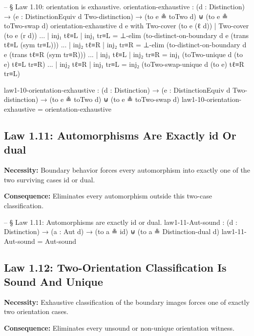 \documentclass[11pt,a4paper]{book}
\def\texttt#1{#1}%
\begin{document}
\begin{code}
-- § Law 1.10: orientation is exhaustive.
orientation-exhaustive :
  (d : Distinction) →
  (e : DistinctionEquiv d Two-distinction) →
  (to e ≗ toTwo d) ⊎ (to e ≗ toTwo-swap d)
orientation-exhaustive d e with Two-cover (to e (ℓ d)) | Two-cover (to e (r d))
... | inj₁ tℓ≡L | inj₁ tr≡L = ⊥-elim (to-distinct-on-boundary d e (trans tℓ≡L (sym tr≡L)))
... | inj₂ tℓ≡R | inj₂ tr≡R = ⊥-elim (to-distinct-on-boundary d e (trans tℓ≡R (sym tr≡R)))
... | inj₁ tℓ≡L | inj₂ tr≡R = inj₁ (toTwo-unique d (to e) tℓ≡L tr≡R)
... | inj₂ tℓ≡R | inj₁ tr≡L = inj₂ (toTwo-swap-unique d (to e) tℓ≡R tr≡L)

law1-10-orientation-exhaustive :
  (d : Distinction) →
  (e : DistinctionEquiv d Two-distinction) →
  (to e ≗ toTwo d) ⊎ (to e ≗ toTwo-swap d)
law1-10-orientation-exhaustive = orientation-exhaustive
\end{code}

\subsection{Law 1.11: Automorphisms Are Exactly id Or dual}

\textbf{Necessity:} Boundary behavior forces every automorphism into exactly one of the two surviving cases \texttt{id} or \texttt{dual}.

\textbf{Consequence:} Eliminates every automorphism outside this two-case classification.

\begin{code}
-- § Law 1.11: Automorphisms are exactly id or dual.
law1-11-Aut-sound :
  (d : Distinction) →
  (a : Aut d) →
  (to a ≗ id) ⊎ (to a ≗ Distinction-dual d)
law1-11-Aut-sound = Aut-sound
\end{code}

\subsection{Law 1.12: Two-Orientation Classification Is Sound And Unique}

\textbf{Necessity:} Exhaustive classification of the boundary images forces one of exactly two orientation cases.

\textbf{Consequence:} Eliminates every unsound or non-unique orientation witness.
\end{document}
